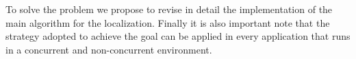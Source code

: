 To solve the problem we propose to revise in detail the implementation of the main algorithm for the localization. 
Finally it is also important note that the strategy adopted to achieve the goal can be applied in every application that runs in a concurrent and non-concurrent environment.









\clearpage
\thispagestyle{empty}